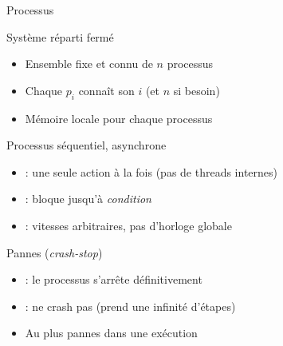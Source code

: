 
\begingroup

\begin{frame}{Processus}

  \begin{block}{Système réparti fermé}
    \begin{itemize}
    \item Ensemble fixe et connu de $n$ processus 
    \item Chaque $p_i$ connaît son  $i$ (et $n$ si besoin)
    \item Mémoire locale  pour chaque processus
    \end{itemize}
  \end{block}

  \begin{block}{Processus séquentiel, asynchrone}
    \begin{itemize}
      \item {} : une seule action à la fois (pas de threads internes)
      \item {} :  bloque jusqu'à \textit{condition}
      \item {} : vitesses arbitraires, pas d’horloge globale
    \end{itemize}
  \end{block}

  \begin{block}{Pannes (\textit{crash-stop})}
    \begin{itemize}
      \item {} : le processus s’arrête définitivement
      \item {} : ne crash pas (prend une infinité d’étapes)
      \item Au plus  pannes dans une exécution
    \end{itemize}
  \end{block}

\end{frame}

\endgroup
\endinput


